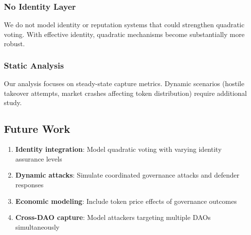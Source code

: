 \subsubsection{No Identity Layer}

We do not model identity or reputation systems that could strengthen quadratic voting. With effective identity, quadratic mechanisms become substantially more robust.

\subsubsection{Static Analysis}

Our analysis focuses on steady-state capture metrics. Dynamic scenarios (hostile takeover attempts, market crashes affecting token distribution) require additional study.

\subsection{Future Work}

\begin{enumerate}
    \item \textbf{Identity integration}: Model quadratic voting with varying identity assurance levels
    \item \textbf{Dynamic attacks}: Simulate coordinated governance attacks and defender responses
    \item \textbf{Economic modeling}: Include token price effects of governance outcomes
    \item \textbf{Cross-DAO capture}: Model attackers targeting multiple DAOs simultaneously
\end{enumerate}
